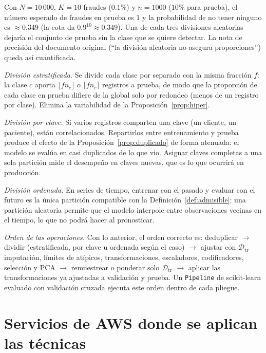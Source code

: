 \documentclass[11pt]{article}
\theoremstyle{definition}
\theoremstyle{remark}
\newcommand{\Dtr}{\mathcal{D}_{\mathrm{tr}}}
\begin{document}
\noindent Con $N=10\,000$, $K=10$ fraudes ($0.1\%$) y $n=1000$ ($10\%$ para prueba), el número esperado de fraudes en prueba es $1$ y la probabilidad de no tener ninguno es $\approx0.349$ (la cota da $0.9^{10}\approx0.349$). Una de cada tres divisiones aleatorias dejaría el conjunto de prueba sin la clase que se quiere detectar. La nota de precisión del documento original (``la división aleatoria no asegura proporciones'') queda así cuantificada.

\medskip

\noindent \emph{División estratificada.} Se divide cada clase por separado con la misma fracción $f$: la clase $c$ aporta $\lfloor fn_c\rfloor$ o $\lceil fn_c\rceil$ registros a prueba, de modo que la proporción de cada clase en prueba difiere de la global solo por redondeo (menos de un registro por clase). Elimina la variabilidad de la Proposición~\ref{prop:hiper}.

\medskip

\noindent \emph{División por clave.} Si varios registros comparten una clave (un cliente, un paciente), están correlacionados. Repartirlos entre entrenamiento y prueba produce el efecto de la Proposición~\ref{prop:duplicado} de forma atenuada: el modelo se evalúa en casi duplicados de lo que vio. Asignar claves completas a una sola partición mide el desempeño en claves nuevas, que es lo que ocurrirá en producción.

\medskip

\noindent \emph{División ordenada.} En series de tiempo, entrenar con el pasado y evaluar con el futuro es la única partición compatible con la Definición~\ref{def:admisible}; una partición aleatoria permite que el modelo interpole entre observaciones vecinas en el tiempo, lo que no podrá hacer al pronosticar.

\medskip

\noindent \emph{Orden de las operaciones.} Con lo anterior, el orden correcto es: deduplicar $\to$ dividir (estratificada, por clave u ordenada según el caso) $\to$ ajustar con $\Dtr$ imputación, límites de atípicos, transformaciones, escaladores, codificadores, selección y PCA $\to$ remuestrear o ponderar solo $\Dtr$ $\to$ aplicar las transformaciones ya ajustadas a validación y prueba. Un \texttt{Pipeline} de scikit-learn evaluado con validación cruzada ejecuta este orden dentro de cada pliegue.

\section{Servicios de AWS donde se aplican las técnicas}\label{sec:aws}
\end{document}
